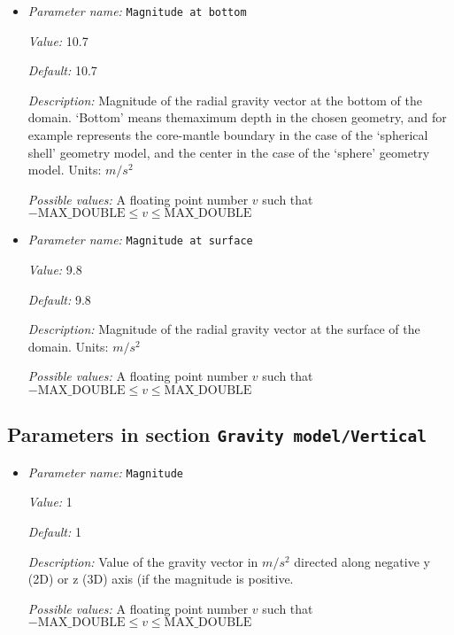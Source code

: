 \begin{itemize}
\item {\it Parameter name:} {\tt Magnitude at bottom}
\label{parameters:Gravity model/Radial linear/Magnitude at bottom}


{\it Value:} 10.7


{\it Default:} 10.7


{\it Description:} Magnitude of the radial gravity vector at the bottom of the domain. `Bottom' means themaximum depth in the chosen geometry, and for example represents the core-mantle boundary in the case of the `spherical shell' geometry model, and the center in the case of the `sphere' geometry model. Units: $m/s^2$


{\it Possible values:} A floating point number $v$ such that $-\text{MAX\_DOUBLE} \leq v \leq \text{MAX\_DOUBLE}$
\item {\it Parameter name:} {\tt Magnitude at surface}
\label{parameters:Gravity model/Radial linear/Magnitude at surface}


{\it Value:} 9.8


{\it Default:} 9.8


{\it Description:} Magnitude of the radial gravity vector at the surface of the domain. Units: $m/s^2$


{\it Possible values:} A floating point number $v$ such that $-\text{MAX\_DOUBLE} \leq v \leq \text{MAX\_DOUBLE}$
\end{itemize}

\subsection{Parameters in section \tt Gravity model/Vertical}
\label{parameters:Gravity_20model/Vertical}

\begin{itemize}
\item {\it Parameter name:} {\tt Magnitude}
\label{parameters:Gravity model/Vertical/Magnitude}


{\it Value:} 1


{\it Default:} 1


{\it Description:} Value of the gravity vector in $m/s^2$ directed along negative y (2D) or z (3D) axis (if the magnitude is positive.


{\it Possible values:} A floating point number $v$ such that $-\text{MAX\_DOUBLE} \leq v \leq \text{MAX\_DOUBLE}$
\end{itemize}

